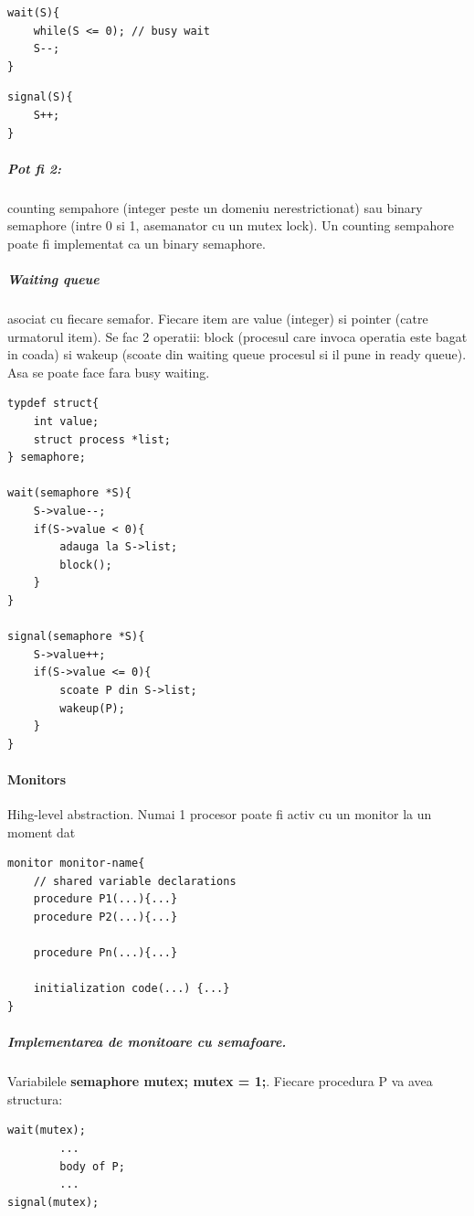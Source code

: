 \documentclass{article}
\begin{document}
\begin{center}
    \begin{lstlisting}
wait(S){
    while(S <= 0); // busy wait
    S--;
}
    \end{lstlisting}
\end{center}
\begin{center}
    \begin{lstlisting}
signal(S){
    S++;
}
    \end{lstlisting}
\end{center}
\subparagraph*{Pot fi 2:} counting sempahore (integer peste un domeniu nerestrictionat) sau binary semaphore (intre 0 si 1, asemanator cu un mutex lock). Un counting sempahore poate fi implementat ca un binary semaphore.

\subparagraph*{Waiting queue} asociat cu fiecare semafor. Fiecare item are value (integer) si pointer (catre urmatorul item). Se fac 2 operatii: block (procesul care invoca operatia este bagat in coada) si wakeup (scoate din waiting queue procesul si il pune in ready queue). Asa se poate face fara busy waiting.
\begin{center}
    \begin{lstlisting}
typdef struct{
    int value;
    struct process *list;
} semaphore;

wait(semaphore *S){
    S->value--;
    if(S->value < 0){
        adauga la S->list;
        block();
    }
}

signal(semaphore *S){
    S->value++;
    if(S->value <= 0){
        scoate P din S->list;
        wakeup(P);
    }
}
    \end{lstlisting}
\end{center}

\paragraph*{Monitors} Hihg-level abstraction. Numai 1 procesor poate fi activ cu un monitor la un moment dat
\begin{center}
    \begin{lstlisting}
monitor monitor-name{
    // shared variable declarations
    procedure P1(...){...}
    procedure P2(...){...}

    procedure Pn(...){...}

    initialization code(...) {...}
}
    \end{lstlisting}
\end{center}

\subparagraph*{Implementarea de monitoare cu semafoare.} Variabilele \textbf{semaphore mutex; mutex = 1;}. Fiecare procedura P va avea structura:
\begin{center}
    \begin{lstlisting}
wait(mutex);
        ...
        body of P;
        ...
signal(mutex);
    \end{lstlisting}
\end{center}
\end{document}
